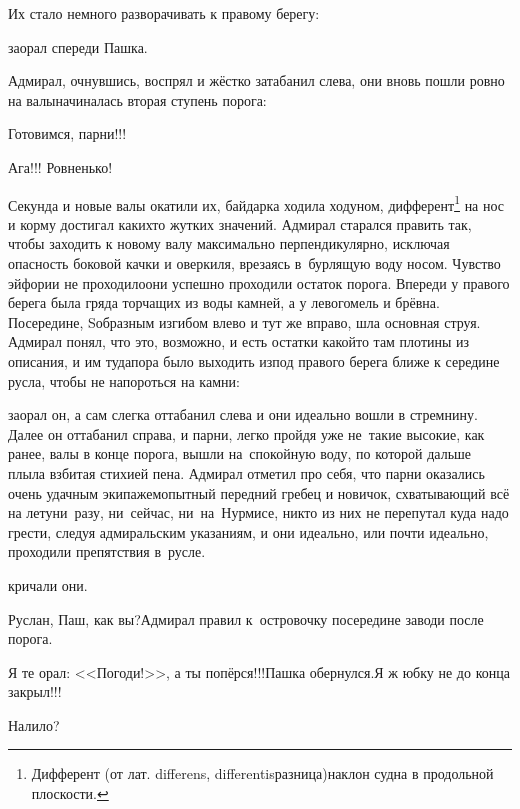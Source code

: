Их стало немного разворачивать к правому берегу:

\mdash заорал спереди Пашка.

Адмирал, очнувшись, воспрял и жёстко затабанил слева, они вновь пошли ровно на валы\mdash начиналась вторая ступень порога:

\diagdash Готовимся, парни!!!

\diagdash Ага!!! Ровненько!

\renewcommand*{\thefootnote}{\fnsymbol{footnote}}
\setcounter{footnote}{0}
Секунда и новые валы окатили их, байдарка ходила ходуном, дифферент\footnote{Дифферент (от лат. differens, differentis\mdash разница)\mdash наклон судна в продольной плоскости\cite{МорскойСправочник}.} на нос и корму достигал каких\sdash то жутких значений. Адмирал старался править так, чтобы заходить к новому валу максимально перпендикулярно, исключая опасность боковой качки и оверкиля, врезаясь в~бурлящую воду носом. Чувство эйфории не проходило\mdash они успешно проходили остаток порога. Впереди у правого берега была гряда торчащих из воды камней, а у левого\mdash мель и брёвна. Посередине, S\sdash образным изгибом влево и тут же вправо, шла основная струя. Адмирал понял, что это, возможно, и есть остатки какой\sdash то там плотины из описания, и им туда\mdash пора было выходить из\sdash под правого берега ближе к середине русла, чтобы не напороться на камни:

\mdash заорал он, а сам слегка оттабанил слева и они идеально вошли в стремнину. Далее он оттабанил справа, и парни, легко пройдя уже не~такие высокие, как ранее, валы в конце порога, вышли на~спокойную воду, по которой дальше плыла взбитая стихией пена. Адмирал отметил про себя, что парни оказались очень удачным экипажем\mdash опытный передний гребец и новичок, схватывающий всё на лету\mdash ни~разу, ни~сейчас, ни~на~Нурмисе, никто из них не перепутал куда надо грести, следуя адмиральским указаниям, и они идеально, или почти идеально, проходили препятствия в~русле.

\mdash кричали они.

\diagdash Руслан, Паш, как вы?\mdash Адмирал правил к~островочку посередине заводи после порога.

\diagdash Я те орал: <<Погоди!>>, а ты попёрся!!!\mdash Пашка обернулся.\mdash Я ж юбку не до конца закрыл!!!

\diagdash Налило?

